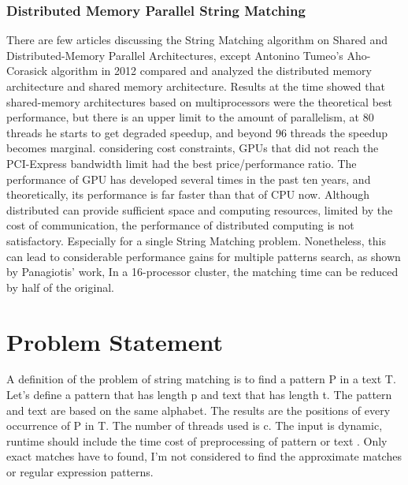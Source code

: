 \documentclass[11pt]{article}       %
\begin{document}
\subsubsection{Distributed Memory Parallel String Matching}
There are few articles discussing the String Matching algorithm on Shared and Distributed-Memory Parallel Architectures, except Antonino Tumeo's Aho-Corasick algorithm in 2012 compared and analyzed the distributed memory architecture and shared memory architecture\cite{Distributed-Memory}. Results at the time showed that shared-memory architectures based on multiprocessors were the theoretical best performance, but there is an upper limit to the amount of parallelism, at 80 threads he starts to get degraded speedup, and beyond 96 threads the speedup becomes marginal. considering cost constraints, GPUs that did not reach the PCI-Express bandwidth limit had the best price/performance ratio. The performance of GPU has developed several times in the past ten years, and theoretically, its performance is far faster than that of CPU now. Although distributed can provide sufficient space and computing resources, limited by the cost of communication, the performance of distributed computing is not satisfactory. Especially for a single String Matching problem. Nonetheless, this can lead to considerable performance gains for multiple patterns search, as shown by Panagiotis' work\cite{MPI}, In a 16-processor cluster, the matching time can be reduced by half of the original.



\section{Problem Statement} \label{problemStatement}


A definition of the problem of string matching is to find a pattern P in a text T. Let's define a pattern that has length p and text that has length t. The pattern and text are based on the same alphabet. The results are the positions of every occurrence of P in T. The number of threads used is c. The input is dynamic, runtime should include the time cost of preprocessing of pattern or text . Only exact matches have to found, I'm not considered to find the approximate matches or regular expression patterns. 



\end{document}
